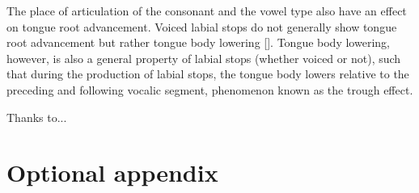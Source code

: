 \documentclass[]{JASAnew}
\begin{document}
The place of articulation of the consonant and the vowel type also have
an effect on tongue root advancement. Voiced labial stops do not
generally show tongue root advancement but rather tongue body lowering
{[}{]}. Tongue body lowering, however, is also a general property of
labial stops (whether voiced or not), such that during the production of
labial stops, the tongue body lowers relative to the preceding and
following vocalic segment, phenomenon known as the trough effect.

\begin{acknowledgments}
Thanks to...
\end{acknowledgments}

\appendix
\section{Optional appendix}










\end{document}
